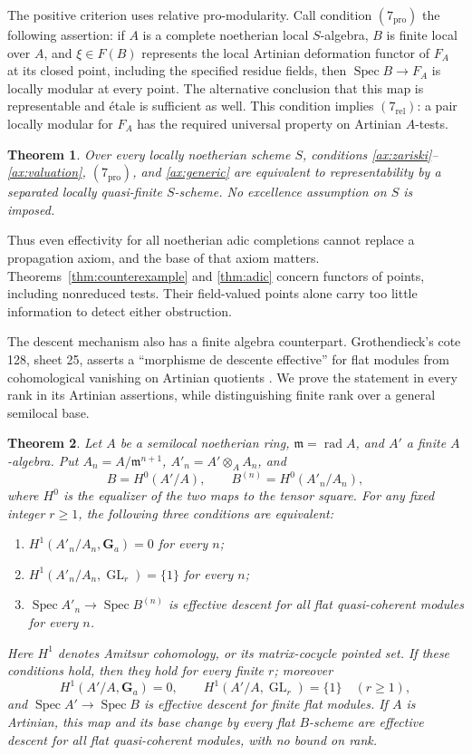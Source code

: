 \documentclass[11pt]{article}
\newtheorem{theorem}{Theorem}[section]
\theoremstyle{definition}\newtheorem{definition}[theorem]{Definition}
\theoremstyle{remark}\newtheorem{remark}[theorem]{Remark}
\newcommand{\Spec}{\operatorname{Spec}}
\newcommand{\GL}{\operatorname{GL}}
\begin{document}
The positive criterion uses relative pro-modularity. Call condition $(7_{\mathrm{pro}})$ the following assertion: if $A$ is a complete noetherian local $S$-algebra, $B$ is finite local over $A$, and $\xi\in F(B)$ represents the local Artinian deformation functor of $F_A$ at its closed point, including the specified residue fields, then $\Spec B\to F_A$ is locally modular at every point. The alternative conclusion that this map is representable and \'etale is sufficient as well. This condition implies $(7_{\mathrm{rel}})$: a pair locally modular for $F_A$ has the required universal property on Artinian $A$-tests.

\begin{theorem}\label{thm:criterion}
Over every locally noetherian scheme $S$, conditions \ref{ax:zariski}--\ref{ax:valuation}, $(7_{\mathrm{pro}})$, and \ref{ax:generic} are equivalent to representability by a separated locally quasi-finite $S$-scheme. No excellence assumption on $S$ is imposed.
\end{theorem}

Thus even effectivity for all noetherian adic completions cannot replace a propagation axiom, and the base of that axiom matters. Theorems~\ref{thm:counterexample} and \ref{thm:adic} concern functors of points, including nonreduced tests. Their field-valued points alone carry too little information to detect either obstruction.


The descent mechanism also has a finite algebra counterpart. Grothendieck's cote 128, sheet 25, asserts a ``morphisme de descente effective'' for flat modules from cohomological vanishing on Artinian quotients \cite{Groth128}. We prove the statement in every rank in its Artinian assertions, while distinguishing finite rank over a general semilocal base.

\begin{theorem}\label{thm:finite-descent}
Let $A$ be a semilocal noetherian ring, $\mathfrak m=\operatorname{rad}A$, and $A'$ a finite $A$-algebra. Put $A_n=A/\mathfrak m^{n+1}$, $A'_n=A'\otimes_AA_n$, and
\[
 B=H^0(A'/A),\qquad B^{(n)}=H^0(A'_n/A_n),
\]
where $H^0$ is the equalizer of the two maps to the tensor square. For any fixed integer $r\geq1$, the following three conditions are equivalent:
\begin{enumerate}[label=(\roman*),leftmargin=*]
\item $H^1(A'_n/A_n,\mathbf G_a)=0$ for every $n$;
\item $H^1(A'_n/A_n,\GL_r)=\{1\}$ for every $n$;
\item $\Spec A'_n\to\Spec B^{(n)}$ is effective descent for all flat quasi-coherent modules for every $n$.
\end{enumerate}
Here $H^1$ denotes Amitsur cohomology, or its matrix-cocycle pointed set. If these conditions hold, then they hold for every finite $r$; moreover
\[
 H^1(A'/A,\mathbf G_a)=0,\qquad
 H^1(A'/A,\GL_r)=\{1\}\quad(r\geq1),
\]
and $\Spec A'\to\Spec B$ is effective descent for finite flat modules. If $A$ is Artinian, this map and its base change by every flat $B$-scheme are effective descent for all flat quasi-coherent modules, with no bound on rank.
\end{theorem}
\end{document}

